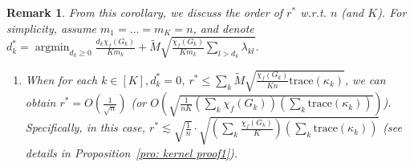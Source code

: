 \documentclass{article}
\DeclareMathOperator*{\argmin}{argmin}
\newtheorem*{remark}{Remark}
\begin{document}
\begin{remark}
    From this corollary, we discuss the order of $r^*$ w.r.t. $n$ (and $K$). For simplicity, assume $m_1 = \dots = m_K = n$, and denote $d_k^* = \argmin_{d_k \geq 0} \frac{d_k \chi_f(G_k)}{K m_k} + \widetilde{M} \sqrt{\frac{\chi_f(G_k)}{K m_k} \sum _{l >d_k} \lambda_{kl}}$. 
\begin{enumerate}[(1)]
\setlength\itemsep{-0.4pt}
    \item When for each $k \in [K], d_k^* = 0$, $r^* \leq \sum_k \widetilde{M} \sqrt{\frac{\chi_f(G_k)}{K n} \mathrm{trace}(\kappa_k)}$, we can obtain $r^* = O(\frac{1}{\sqrt{n}})$ (or $O\left(\sqrt{\frac{1}{n K} (\sum_k \chi_f(G_k))(\sum_k \mathrm{trace}(\kappa_k))}\right)$).    
    Specifically, in this case, $r^* \lesssim \sqrt{\frac{1}{n}} \cdot \sqrt{(\sum_k \frac{\chi_f(G_k)}{K}) (\sum_k \mathrm{trace} (\kappa_k))} $ (see details in Proposition~\ref{pro: kernel proof1}).
    

\end{enumerate}
\end{remark}
\end{document}

